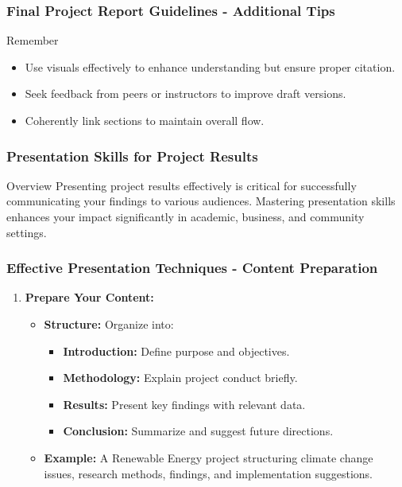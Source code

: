 \documentclass[aspectratio=169]{beamer}
\begin{document}
\begin{frame}[fragile]
    \frametitle{Final Project Report Guidelines - Additional Tips}
    
    \begin{block}{Remember}
        \begin{itemize}
            \item Use visuals effectively to enhance understanding but ensure proper citation.
            \item Seek feedback from peers or instructors to improve draft versions.
            \item Coherently link sections to maintain overall flow.
        \end{itemize}
    \end{block}
    
\end{frame}

\begin{frame}[fragile]
    \frametitle{Presentation Skills for Project Results}
    \begin{block}{Overview}
        Presenting project results effectively is critical for successfully communicating your findings to various audiences. 
        Mastering presentation skills enhances your impact significantly in academic, business, and community settings.
    \end{block}
\end{frame}

\begin{frame}[fragile]
    \frametitle{Effective Presentation Techniques - Content Preparation}
    \begin{enumerate}
        \item \textbf{Prepare Your Content:}
        \begin{itemize}
            \item \textbf{Structure:} Organize into:
            \begin{itemize}
                \item \textbf{Introduction:} Define purpose and objectives.
                \item \textbf{Methodology:} Explain project conduct briefly.
                \item \textbf{Results:} Present key findings with relevant data.
                \item \textbf{Conclusion:} Summarize and suggest future directions.
            \end{itemize}
            \item \textbf{Example:} A Renewable Energy project structuring climate change issues, research methods, findings, and implementation suggestions.
        \end{itemize}
    \end{enumerate}
\end{frame}
\end{document}
